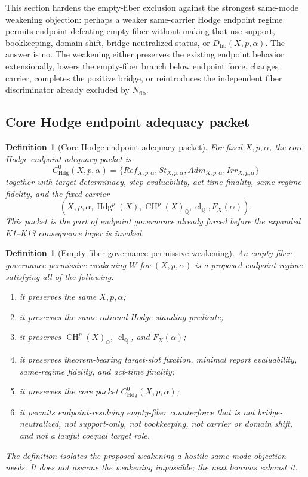 \documentclass[11pt]{article}
\newtheorem{definition}[theorem]{Definition}
\newcommand{\QQ}{\mathbb{Q}}
\newcommand{\CH}{\operatorname{CH}}
\newcommand{\Hdg}{\operatorname{Hdg}}
\newcommand{\clQ}{\operatorname{cl}_{\QQ}}
\begin{document}
This section hardens the empty-fiber exclusion against the strongest same-mode weakening objection: perhaps a weaker same-carrier Hodge endpoint regime permits endpoint-defeating empty fiber without making that use support, bookkeeping, domain shift, bridge-neutralized status, or $D_{\mathrm{fib}}(X,p,\alpha)$.  The answer is no.  The weakening either preserves the existing endpoint behavior extensionally, lowers the empty-fiber branch below endpoint force, changes carrier, completes the positive bridge, or reintroduces the independent fiber discriminator already excluded by $N_{\mathrm{fib}}$.

\subsection{Core Hodge endpoint adequacy packet}

\begin{definition}[Core Hodge endpoint adequacy packet]
For fixed $X,p,\alpha$, the core Hodge endpoint adequacy packet is
\[
C^0_{\Hdg}(X,p,\alpha)=\{Ref_{X,p,\alpha},St_{X,p,\alpha},Adm_{X,p,\alpha},Irr_{X,p,\alpha}\}
\]
together with target determinacy, step evaluability, act-time finality, same-regime fidelity, and the fixed carrier
\[
(X,p,\alpha,\Hdg^p(X),\CH^p(X)_\QQ,\clQ,F_X(\alpha)).
\]
This packet is the part of endpoint governance already forced before the expanded K1--K13 consequence layer is invoked.
\end{definition}

\begin{definition}[Empty-fiber-governance-permissive weakening]
An empty-fiber-governance-permissive weakening $W$ for $(X,p,\alpha)$ is a proposed endpoint regime satisfying all of the following:
\begin{enumerate}[label=(\roman*)]
\item it preserves the same $X,p,\alpha$;
\item it preserves the same rational Hodge-standing predicate;
\item it preserves $\CH^p(X)_\QQ$, $\clQ$, and $F_X(\alpha)$;
\item it preserves theorem-bearing target-slot fixation, minimal report evaluability, same-regime fidelity, and act-time finality;
\item it preserves the core packet $C^0_{\Hdg}(X,p,\alpha)$;
\item it permits endpoint-resolving empty-fiber counterforce that is not bridge-neutralized, not support-only, not bookkeeping, not carrier or domain shift, and not a lawful coequal target role.
\end{enumerate}
The definition isolates the proposed weakening a hostile same-mode objection needs.  It does not assume the weakening impossible; the next lemmas exhaust it.
\end{definition}
\end{document}
